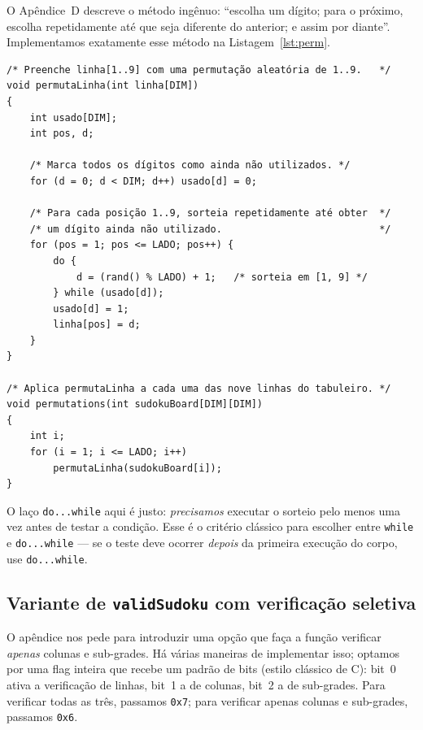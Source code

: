 \documentclass[11pt,a4paper,oneside]{report}
\newcommand{\codigo}[1]{\texttt{\color{deitelblue}#1}}
\begin{document}
O Apêndice~D descreve o método ingênuo: ``escolha um dígito; para o próximo,
escolha repetidamente até que seja diferente do anterior; e assim por
diante''. Implementamos exatamente esse método na Listagem~\ref{lst:perm}.

\begin{lstlisting}[caption={Geração de uma linha como permutação aleatória.},label={lst:perm}]
/* Preenche linha[1..9] com uma permutação aleatória de 1..9.   */
void permutaLinha(int linha[DIM])
{
    int usado[DIM];
    int pos, d;

    /* Marca todos os dígitos como ainda não utilizados. */
    for (d = 0; d < DIM; d++) usado[d] = 0;

    /* Para cada posição 1..9, sorteia repetidamente até obter  */
    /* um dígito ainda não utilizado.                           */
    for (pos = 1; pos <= LADO; pos++) {
        do {
            d = (rand() % LADO) + 1;   /* sorteia em [1, 9] */
        } while (usado[d]);
        usado[d] = 1;
        linha[pos] = d;
    }
}

/* Aplica permutaLinha a cada uma das nove linhas do tabuleiro. */
void permutations(int sudokuBoard[DIM][DIM])
{
    int i;
    for (i = 1; i <= LADO; i++)
        permutaLinha(sudokuBoard[i]);
}
\end{lstlisting}

\begin{boapratica}
O laço \codigo{do...while} aqui é justo: \emph{precisamos} executar o sorteio
pelo menos uma vez antes de testar a condição. Esse é o critério clássico
para escolher entre \codigo{while} e \codigo{do...while} --- se o teste
deve ocorrer \emph{depois} da primeira execução do corpo, use
\codigo{do...while}.
\end{boapratica}

\subsection{Variante de \texttt{validSudoku} com verificação seletiva}

O apêndice nos pede para introduzir uma opção que faça a função verificar
\emph{apenas} colunas e sub-grades. Há várias maneiras de implementar isso;
optamos por uma flag inteira que recebe um padrão de bits (estilo clássico
de C): bit~0 ativa a verificação de linhas, bit~1 a de colunas, bit~2 a de
sub-grades. Para verificar todas as três, passamos \codigo{0x7}; para
verificar apenas colunas e sub-grades, passamos \codigo{0x6}.
\end{document}
